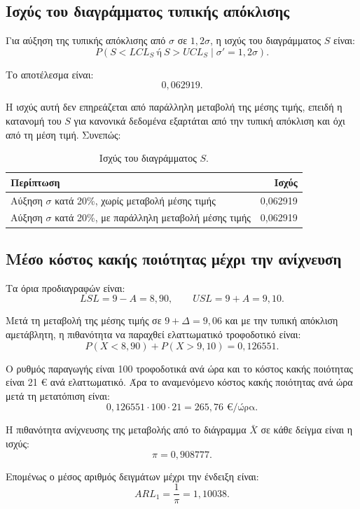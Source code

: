 \documentclass[12pt,a4paper]{article}
\begin{document}
\subsection{Ισχύς του διαγράμματος τυπικής απόκλισης}

Για αύξηση της τυπικής απόκλισης από \(\sigma\) σε \(1{,}2\sigma\), η ισχύς
του διαγράμματος \(S\) είναι:
\[
    P(S<LCL_S \ \text{ή}\ S>UCL_S \mid \sigma'=1{,}2\sigma).
\]

Το αποτέλεσμα είναι:
\[
    \boxed{0{,}062919}.
\]

Η ισχύς αυτή δεν επηρεάζεται από παράλληλη μεταβολή της μέσης τιμής, επειδή η
κατανομή του \(S\) για κανονικά δεδομένα εξαρτάται από την τυπική απόκλιση και
όχι από τη μέση τιμή. Συνεπώς:

\begin{table}[H]
\centering
\caption{Ισχύς του διαγράμματος \(S\).}
\begin{tabular}{lr}
\toprule
\textbf{Περίπτωση} & \textbf{Ισχύς} \\
\midrule
Αύξηση \(\sigma\) κατά 20\%, χωρίς μεταβολή μέσης τιμής & 0,062919 \\
Αύξηση \(\sigma\) κατά 20\%, με παράλληλη μεταβολή μέσης τιμής & 0,062919 \\
\bottomrule
\end{tabular}
\end{table}

\subsection{Μέσο κόστος κακής ποιότητας μέχρι την ανίχνευση}

Τα όρια προδιαγραφών είναι:
\[
    LSL=9-A=8{,}90,\qquad USL=9+A=9{,}10.
\]

Μετά τη μεταβολή της μέσης τιμής σε \(9+\Delta=9{,}06\) και με την τυπική
απόκλιση αμετάβλητη, η πιθανότητα να παραχθεί ελαττωματικό τροφοδοτικό είναι:
\[
    P(X<8{,}90)+P(X>9{,}10)=0{,}126551.
\]

Ο ρυθμός παραγωγής είναι 100 τροφοδοτικά ανά ώρα και το κόστος κακής ποιότητας
είναι 21 € ανά ελαττωματικό. Άρα το αναμενόμενο κόστος κακής ποιότητας ανά
ώρα μετά τη μετατόπιση είναι:
\[
    0{,}126551 \cdot 100 \cdot 21 = 265{,}76 \text{ €/ώρα}.
\]

Η πιθανότητα ανίχνευσης της μεταβολής από το διάγραμμα \(\bar X\) σε κάθε
δείγμα είναι η ισχύς:
\[
    \pi=0{,}908777.
\]

Επομένως ο μέσος αριθμός δειγμάτων μέχρι την ένδειξη είναι:
\[
    ARL_1=\frac{1}{\pi}=1{,}10038.
\]
\end{document}
